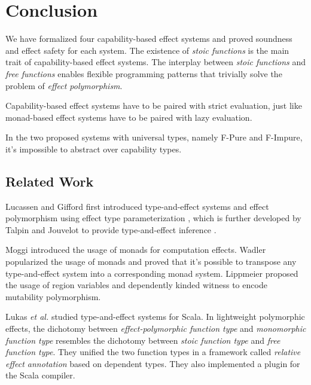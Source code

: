 \section{Conclusion}

We have formalized four capability-based effect systems and proved
soundness and effect safety for each system. The existence of
\emph{stoic functions} is the main trait of capability-based effect
systems. The interplay between \emph{stoic functions} and \emph{free
  functions} enables flexible programming patterns that trivially
solve the problem of \emph{effect polymorphism}.

Capability-based effect systems have to be paired with strict
evaluation, just like monad-based effect systems have to be paired
with lazy evaluation.

In the two proposed systems with universal types, namely F-Pure and
F-Impure, it's impossible to abstract over capability types.

\subsection{Related Work}

Lucassen and Gifford first introduced type-and-effect
systems\cite{gifford1986integrating} and effect polymorphism using
effect type parameterization \cite{lucassen1988polymorphic}, which is
further developed by Talpin and Jouvelot to provide type-and-effect
inference \cite{talpin1992polymorphic, talpin1994type}.

Moggi introduced the usage of monads for computation
effects\cite{moggi1991notions}. Wadler popularized the usage of
monads\cite{wadler1992comprehending, wadler1995monads} and proved that
it's possible to transpose any type-and-effect system into a
corresponding monad system\cite{wadler2003marriage}. Lippmeier
proposed the usage of region variables and dependently kinded witness
to encode mutability polymorphism\cite{lippmeier2009witnessing}.

Lukas \emph{et al.}  studied type-and-effect systems for
Scala\cite{rytz2012lightweight, rytz2013flow, lukas2014effect}.  In
lightweight polymorphic effects\cite{rytz2012lightweight}, the
dichotomy between \emph{effect-polymorphic function type} and
\emph{monomorphic function type} resembles the dichotomy between
\emph{stoic function type} and \emph{free function type}.  They
unified the two function types in a framework called \emph{relative
  effect annotation} based on dependent types. They also implemented a
plugin for the Scala compiler.

